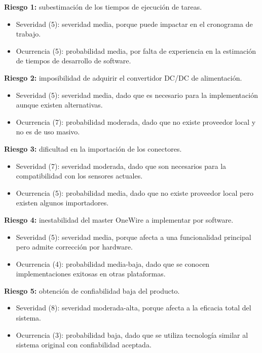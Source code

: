 \documentclass[
11pt, %
codirector, %
]{charter}
\begin{document}
\textbf{Riesgo 1:} subestimación de los tiempos de ejecución de tareas.
		\begin{itemize}
			\item Severidad (5): severidad media, porque puede impactar en el cronograma de trabajo.
			\item Ocurrencia (5): probabilidad media, por falta de experiencia en la estimación de tiempos de desarrollo de software. 
		\end{itemize}
\textbf{Riesgo 2:} imposibilidad de adquirir el convertidor DC/DC de alimentación.
		\begin{itemize}
			\item Severidad (5): severidad media, dado que es necesario para la implementación aunque existen alternativas.
			\item Ocurrencia (7): probabilidad moderada, dado que no existe proveedor local y no 	es de uso masivo. 
		\end{itemize} 
\textbf{Riesgo 3:} dificultad en la importación de los conectores.
		\begin{itemize}
			\item Severidad (7): severidad moderada, dado que son necesarios para la 				compatibilidad con los sensores actuales.
			\item Ocurrencia (5): probabilidad media, dado que no existe proveedor local pero 		existen algunos importadores. 
		\end{itemize} 
\textbf{Riesgo 4:} inestabilidad del master OneWire a implementar por software.
		\begin{itemize}
			\item Severidad (5): severidad media, porque afecta a una funcionalidad principal pero admite corrección por hardware.
			\item Ocurrencia (4): probabilidad media-baja, dado que se conocen implementaciones exitosas en otras plataformas. 
		\end{itemize}   
\textbf{Riesgo 5:} obtención de confiabilidad baja del producto.
		\begin{itemize}
			\item Severidad (8): severidad moderada-alta, porque afecta a la eficacia total del sistema.
			\item Ocurrencia (3): probabilidad baja, dado que se utiliza tecnología similar al sistema original con confiabilidad aceptada. 
		\end{itemize}   
\end{document}

